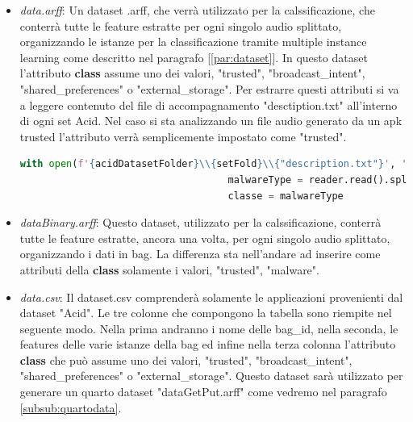 \begin{itemize}
    \item \textit{data.arff}: Un dataset .arff, che verrà utilizzato per la calssificazione, che conterrà tutte le feature estratte per ogni singolo audio splittato, organizzando le istanze per la classificazione tramite multiple instance learning come descritto nel paragrafo [\ref{par:dataset}]. In questo dataset l'attributo \textbf{class} assume uno dei valori, "trusted", "broadcast\_intent", "shared\_preferences" o "external\_storage". Per estrarre questi attributi si va a leggere contenuto del file di accompagnamento "desctiption.txt" all'interno di ogni set Acid. Nel caso si sta analizzando un file audio generato da un apk trusted l'attributo verrà semplicemente impostato come "trusted".
    \begin{lstlisting}[language=Python, caption=Get android resources, label = lst:getREs]
     with open(f'{acidDatasetFolder}\\{setFold}\\{"description.txt"}', 'r') as reader:
                                    malwareType = reader.read().split(":")[1]
                                    classe = malwareType
    \end{lstlisting}
    \item \textit{dataBinary.arff}: Questo dataset, utilizzato per la calssificazione, conterrà tutte le feature estratte, ancora una volta, per ogni singolo audio splittato, organizzando i dati in bag. La differenza sta nell'andare ad inserire come attributi della \textbf{class} solamente i valori, "trusted", "malware".
    \item \textit{data.csv}: Il dataset.csv comprenderà solamente le applicazioni provenienti dal dataset "Acid". Le tre colonne che compongono la tabella sono riempite nel seguente modo. Nella prima andranno i nome delle bag\_id, nella seconda, le features delle varie istanze della bag ed infine nella terza colonna l'attributo \textbf{class} che può assume uno dei valori, "trusted", "broadcast\_intent", "shared\_preferences" o "external\_storage". Questo dataset sarà utilizzato per generare un quarto dataset "dataGetPut.arff" come vedremo nel paragrafo \ref{subsub:quartodata}. 
\end{itemize}

